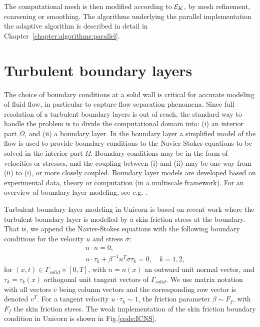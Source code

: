 The computational mesh is then modified according to $ {\cal E}_K$, by
mesh refinement, coarsening or smoothing. The algorithms underlying
the parallel implementation the adaptive algorithm is described in
detail in Chapter~\ref{chapter:algorithms:parallel}.

\section{Turbulent boundary layers}
\label{section:blayer}

The choice of boundary conditions at a solid wall is critical for
accurate modeling of fluid flow, in particular to capture flow
separation phenomena. Since full resolution of a turbulent boundary
layers is out of reach, the standard way to handle the problem is to
divide the computational domain into: (i) an interior part $\Omega$,
and (ii) a boundary layer.  In the boundary layer a simplified model
of the flow is used to provide boundary conditions to the
Navier-Stokes equations to be solved in the interior part
$\Omega$. Boundary conditions may be in the form of velocities or
stresses, and the coupling between (i) and (ii) may be one-way from
(ii) to (i), or more closely coupled. Boundary layer models are
developed based on experimental data, theory or computation (in a
multiscale framework). For an overview of boundary layer modeling, see
e.g. \cite{Sagaut2005,SagautDeckTerracol2006}.

Turbulent boundary layer modeling in Unicorn is based on recent
work \cite{Hoffman2009,Hoffman2006c,HoffmanJohnson2008b,JanssonHoffman2009}
where the turbulent boundary layer is modelled by a skin friction
stress at the boundary. That is, we append the Navier-Stokes equations
with the following boundary conditions for the velocity $u$ and stress
$\sigma$:
\begin{eqnarray}
&&u\cdot n=0, \label{slfra} \\ &&u\cdot \tau _k + \beta
^{-1}n^T\sigma \tau _k=0,\quad k=1,2, \label{slfrb}
\end{eqnarray}
for $(x,t)\in \Gamma_{solid}\times [0,T]$, with $n=n(x)$ an outward
unit normal vector, and $\tau_k=\tau_k(x)$ orthogonal unit tangent
vectors of $\Gamma_{solid}$. We use matrix notation with all vectors
$v$ being column vectors and the corresponding row vector is denoted
$v^T$. For a tangent velocity $u\cdot \tau_k \sim 1$, the friction
parameter $\beta \sim F_f$, with $F_f$ the skin friction stress. The
weak implementation of the skin friction boundary condition in Unicorn
is shown in Fig.\ref{code:ICNS}.


